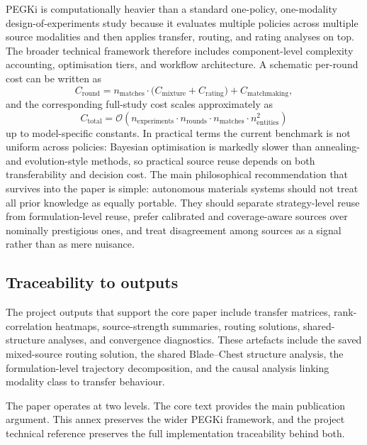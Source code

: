 \documentclass[twoside,twocolumn,9pt]{article}
\begin{document}
PEGKi is computationally heavier than a standard one-policy, one-modality design-of-experiments study because it evaluates multiple policies across multiple source modalities and then applies transfer, routing, and rating analyses on top. The broader technical framework therefore includes component-level complexity accounting, optimisation tiers, and workflow architecture. A schematic per-round cost can be written as
\[
C_{\mathrm{round}}=
n_{\mathrm{matches}}
\cdot
\bigl(
C_{\mathrm{mixture}}
+C_{\mathrm{rating}}
\bigr)
+C_{\mathrm{matchmaking}},
\]
and the corresponding full-study cost scales approximately as
\[
C_{\mathrm{total}}
=
\mathcal{O}\!\left(
n_{\mathrm{experiments}}
\cdot
n_{\mathrm{rounds}}
\cdot
n_{\mathrm{matches}}
\cdot
n_{\mathrm{entities}}^2
\right)
\]
up to model-specific constants. In practical terms the current benchmark is not uniform across policies: Bayesian optimisation is markedly slower than annealing- and evolution-style methods, so practical source reuse depends on both transferability and decision cost. The main philosophical recommendation that survives into the paper is simple: autonomous materials systems should not treat all prior knowledge as equally portable. They should separate strategy-level reuse from formulation-level reuse, prefer calibrated and coverage-aware sources over nominally prestigious ones, and treat disagreement among sources as a signal rather than as mere nuisance.

\subsection{Traceability to outputs}

The project outputs that support the core paper include transfer matrices, rank-correlation heatmaps, source-strength summaries, routing solutions, shared-structure analyses, and convergence diagnostics. These artefacts include the saved mixed-source routing solution, the shared Blade--Chest structure analysis, the formulation-level trajectory decomposition, and the causal analysis linking modality class to transfer behaviour.

The paper operates at two levels. The core text provides the main publication argument. This annex preserves the wider PEGKi framework, and the project technical reference preserves the full implementation traceability behind both.

\balance
\end{document}
